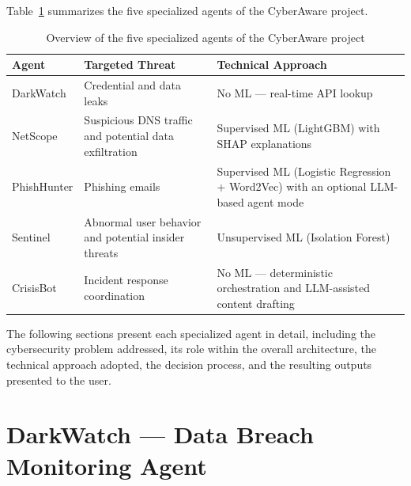 \documentclass[12pt,a4paper]{report}
\newcommand{\ProjectName}{CyberAware}
\begin{document}
Table~\ref{tab:agents-overview} summarizes the five specialized agents of the \ProjectName{} project.

\begin{table}[H]
\centering
\small

\begin{tabular}{@{}>{\raggedright\arraybackslash}p{2.3cm}
                >{\raggedright\arraybackslash}p{4.3cm}
                >{\raggedright\arraybackslash}p{4.3cm}@{}}

\toprule

\textbf{Agent} & \textbf{Targeted Threat} & \textbf{Technical Approach} \\

\midrule

DarkWatch & Credential and data leaks & No ML --- real-time API lookup \\

NetScope & Suspicious DNS traffic and potential data exfiltration & Supervised ML (LightGBM) with SHAP explanations \\

PhishHunter & Phishing emails & Supervised ML (Logistic Regression + Word2Vec) with an optional LLM-based agent mode \\

Sentinel & Abnormal user behavior and potential insider threats & Unsupervised ML (Isolation Forest) \\

CrisisBot & Incident response coordination & No ML --- deterministic orchestration and LLM-assisted content drafting \\

\bottomrule

\end{tabular}

\caption{Overview of the five specialized agents of the \ProjectName{} project}
\label{tab:agents-overview}

\end{table}

The following sections present each specialized agent in detail, including the cybersecurity problem addressed, its role within the overall architecture, the technical approach adopted, the decision process, and the resulting outputs presented to the user.

\section{DarkWatch --- Data Breach Monitoring Agent}
\end{document}
